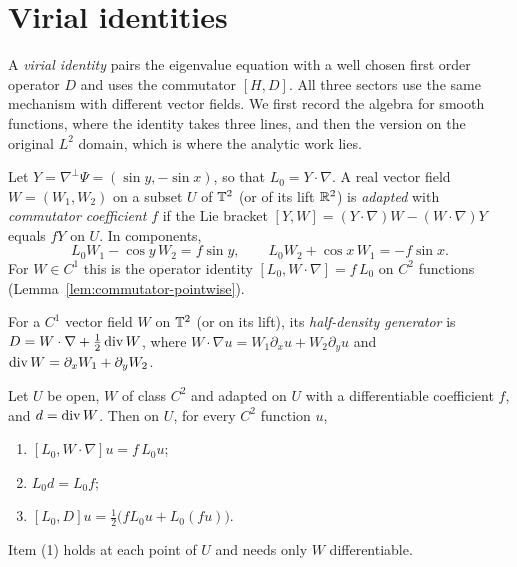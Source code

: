 \chapter{Virial identities}
\label{chap:virial}

A \emph{virial identity} pairs the eigenvalue equation with a well chosen
first order operator $D$ and uses the commutator $[H,D]$. All three sectors
use the same mechanism with different vector fields. We first record the
algebra for smooth functions, where the identity takes three lines, and then
the version on the original $L^2$ domain, which is where the analytic work
lies.

\begin{definition}
\label{def:adapted-field}
\leanok
Let $Y=\nabla^\perp\Psi=(\sin y,-\sin x)$, so that $L_0=Y\cdot\nabla$. A real
vector field $W=(W_1,W_2)$ on a subset $U$ of $\mathbb{T}^2$ (or of its lift $\mathbb{R}^2$) is
\emph{adapted} with \emph{commutator coefficient} $f$ if the Lie bracket
$[Y,W]=(Y\cdot\nabla)W-(W\cdot\nabla)Y$ equals $fY$ on $U$. In components,
\[
  L_0W_1-\cos y\,W_2=f\sin y,\qquad L_0W_2+\cos x\,W_1=-f\sin x .
\]
For $W\in C^1$ this is the operator identity $[L_0,W\cdot\nabla]=f\,L_0$ on
$C^2$ functions (Lemma~\ref{lem:commutator-pointwise}).
\end{definition}

\begin{definition}
\label{def:half-density-generator}
\leanok
For a $C^1$ vector field $W$ on $\mathbb{T}^2$ (or on its lift), its
\emph{half-density generator} is $D=W\cdot\nabla+\tfrac12\operatorname{div} W$, where
$W\cdot\nabla u=W_1\partial_xu+W_2\partial_yu$ and
$\operatorname{div} W=\partial_xW_1+\partial_yW_2$.
\end{definition}

\begin{lemma}
\label{lem:commutator-pointwise}
\leanok
Let $U$ be open, $W$ of class $C^2$ and adapted on $U$ with a differentiable
coefficient $f$, and $d=\operatorname{div} W$. Then on $U$, for every $C^2$ function $u$,
\begin{enumerate}
  \item $[L_0,W\cdot\nabla]u=f\,L_0u$;
  \item $L_0d=L_0f$;
  \item $[L_0,D]u=\tfrac12\bigl(fL_0u+L_0(fu)\bigr)$.
\end{enumerate}
Item (1) holds at each point of $U$ and needs only $W$ differentiable.
\end{lemma}

